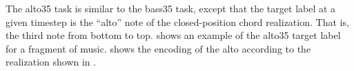 
The \gls{alto35} task is similar to the \gls{bass35} task,
except that the target label at a given timestep is the
``alto'' note of the \gls{closed-position} chord
realization. That is, the third note from bottom to top.
 shows an example of the \gls{alto35}
target label for a fragment of music. 
shows the encoding of the alto according to the realization
shown in .




